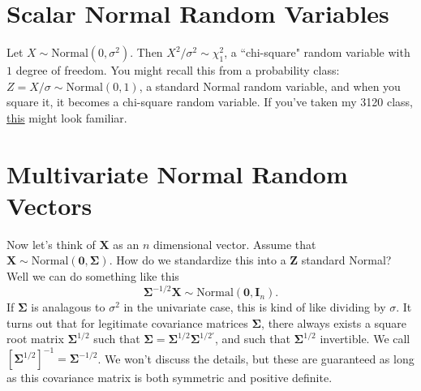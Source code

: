 \documentclass{article}\usepackage[]{graphicx}\usepackage[]{color}
\begin{document}
\section{Scalar Normal Random Variables}

Let $X \sim \text{Normal}(0, \sigma^2)$. Then $X^2 / \sigma^2 \sim \chi^2_1$, a ``chi-square" random variable with $1$ degree of freedom. You might recall this from a probability class: $Z = X / \sigma \sim \text{Normal}(0,1)$, a standard Normal random variable, and when you square it, it becomes a chi-square random variable. If you've taken my 3120 class, \href{http://www.people.virginia.edu/~trb5me/3120_slides/6/6.4/6.4.pdf}{this} might look familiar.

\section{Multivariate Normal Random Vectors}

Now let's think of $\mathbf{X}$ as an $n$ dimensional vector.  Assume that $\mathbf{X} \sim \text{Normal}(\bm{0}, \bm{\Sigma} )$. How do we standardize this into a $\mathbf{Z}$ standard Normal? Well we can do something like this
\[
\bm{\Sigma}^{-1/2}\mathbf{X} \sim \text{Normal}(\bm{0}, \mathbf{I}_n).
\]
If $\bm{\Sigma}$ is analagous to $\sigma^2$ in the univariate case, this is kind of like dividing by $\sigma$. It turns out that for legitimate covariance matrices $\bm{\Sigma}$, there always exists a square root matrix $\bm{\Sigma}^{1/2}$ such that $\bm{\Sigma} = \bm{\Sigma}^{1/2} \bm{\Sigma}^{1/2'}$, and such that $\bm{\Sigma}^{1/2}$ invertible. We call $[\bm{\Sigma}^{1/2}]^{-1} = \bm{\Sigma}^{-1/2}$.  We won't discuss the details, but these are guaranteed as long as this covariance matrix is both symmetric and positive definite.
\newline
\end{document}
